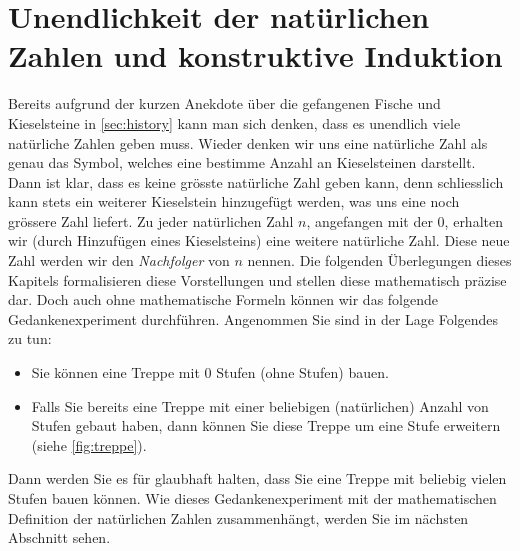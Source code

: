 \section{Unendlichkeit der natürlichen Zahlen und konstruktive Induktion}
Bereits aufgrund der kurzen Anekdote über die gefangenen Fische und Kieselsteine in \cref{sec:history} kann man sich denken, dass es unendlich viele natürliche Zahlen geben muss. Wieder denken wir uns eine natürliche Zahl als genau das Symbol, welches eine bestimme Anzahl an Kieselsteinen darstellt. Dann ist klar, dass es keine grösste natürliche Zahl geben kann, denn schliesslich kann stets ein weiterer Kieselstein hinzugefügt werden, was uns eine noch grössere Zahl liefert. Zu jeder natürlichen Zahl $n$, angefangen mit der $0$, erhalten wir (durch Hinzufügen eines Kieselsteins) eine weitere natürliche Zahl. Diese neue Zahl werden wir den \textit{Nachfolger} von $n$ nennen. Die folgenden Überlegungen dieses Kapitels formalisieren diese
Vorstellungen und stellen diese mathematisch präzise dar. Doch auch ohne mathematische Formeln können wir das folgende Gedankenexperiment durchführen. Angenommen Sie sind in der Lage Folgendes zu tun:
\begin{itemize}
	\item Sie können eine Treppe mit $0$ Stufen (ohne Stufen) bauen.
	\item Falls Sie bereits eine Treppe mit einer beliebigen (natürlichen) Anzahl von Stufen gebaut haben, dann können Sie diese Treppe um eine Stufe erweitern (siehe \cref{fig:treppe}).
\end{itemize}
Dann werden Sie es für glaubhaft halten, dass Sie eine Treppe mit beliebig vielen Stufen bauen können. Wie dieses Gedankenexperiment mit der mathematischen Definition der natürlichen Zahlen zusammenhängt, werden Sie im nächsten Abschnitt sehen.

